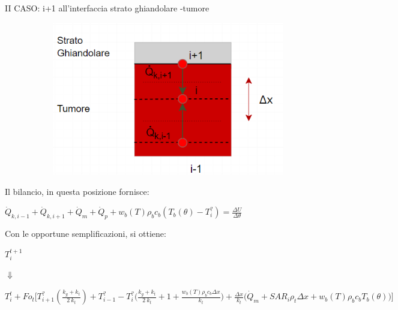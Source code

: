 \begin{description}
\item[II CASO: i+1 all'interfaccia strato ghiandolare -tumore]
    \begin{figure}[H]
    \centering
    \includegraphics[width=.6\textwidth]{Immagini/Nodi/nodo12.2.png} 
    \label{nodo12}
\end{figure}
\end{description}
\noindent
Il bilancio, in questa posizione fornisce:
\begin{center}
	$ \Dot{Q} _{k, i-1} +\Dot{Q} _{k, i+1}+ \Dot{Q} _{m} +\Dot{Q} _{p}+ w_b (T) \rho _b c_b (T_b(\theta)-T_i ^?)= \frac{\Delta U}{\Delta \theta} $
\end{center}
Con le opportune semplificazioni, si ottiene:
\begin{center}
	$T_i ^{t+1} $
\end{center}
\begin{center}
	$\Downarrow$
\end{center}
\begin{center}
	$T_i ^t + Fo_{t} \Bigg[ T_{i+1} ^? (\frac{k_g+ k_{t}}{2 \: k_t}) + T_{i-1} ^?- T_i ^? \Big(\frac{k_g+ k_{t}}{2 \: k_t} + 1 + \frac{ w_b (T) \rho _b c_b \Delta x }{k_{t}} \Big) + \frac{\Delta x }{k_{t}} \Big(\Dot{Q} _{m} +  SAR_i \rho _{t} \Delta x + w_b (T) \rho _b c_b T_b(\theta)\Big) \Bigg]$
\end{center}

